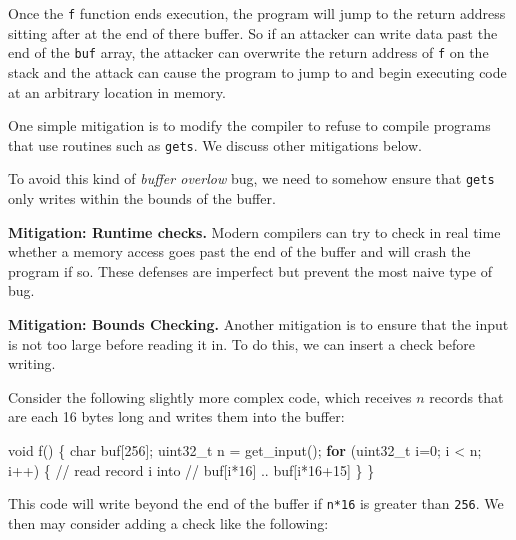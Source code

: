 \documentclass[
  letterpaper,
]{scrbook}
\newenvironment{Shaded}{\begin{snugshade}}{\end{snugshade}}
\newcommand{\CommentTok}[1]{\textcolor[rgb]{0.37,0.37,0.37}{#1}}
\newcommand{\ControlFlowTok}[1]{\textcolor[rgb]{0.00,0.23,0.31}{\textbf{#1}}}
\newcommand{\DataTypeTok}[1]{\textcolor[rgb]{0.68,0.00,0.00}{#1}}
\newcommand{\DecValTok}[1]{\textcolor[rgb]{0.68,0.00,0.00}{#1}}
\newcommand{\NormalTok}[1]{\textcolor[rgb]{0.00,0.23,0.31}{#1}}
\newcommand{\OperatorTok}[1]{\textcolor[rgb]{0.37,0.37,0.37}{#1}}
\theoremstyle{definition}
\theoremstyle{plain}
\theoremstyle{plain}
\theoremstyle{remark}
\begin{document}
Once the \texttt{f} function ends execution, the program will jump to
the return address sitting after at the end of there buffer. So if an
attacker can write data past the end of the \texttt{buf} array, the
attacker can overwrite the return address of \texttt{f} on the stack and
the attack can cause the program to jump to and begin executing code at
an arbitrary location in memory.

One simple mitigation is to modify the compiler to refuse to compile
programs that use routines such as \texttt{gets}. We discuss other
mitigations below.

To avoid this kind of \emph{buffer overlow} bug, we need to somehow
ensure that \texttt{gets} only writes within the bounds of the buffer.

\textbf{Mitigation: Runtime checks.} Modern compilers can try to check
in real time whether a memory access goes past the end of the buffer and
will crash the program if so. These defenses are imperfect but prevent
the most naive type of bug.

\textbf{Mitigation: Bounds Checking.} Another mitigation is to ensure
that the input is not too large before reading it in. To do this, we can
insert a check before writing.

Consider the following slightly more complex code, which receives \(n\)
records that are each 16 bytes long and writes them into the buffer:

\begin{Shaded}
\begin{Highlighting}[]
\DataTypeTok{void}\NormalTok{ f}\OperatorTok{()} \OperatorTok{\{}
    \DataTypeTok{char}\NormalTok{ buf}\OperatorTok{[}\DecValTok{256}\OperatorTok{];}
    \DataTypeTok{uint32\_t}\NormalTok{ n }\OperatorTok{=}\NormalTok{ get\_input}\OperatorTok{();}
    \ControlFlowTok{for} \OperatorTok{(}\DataTypeTok{uint32\_t}\NormalTok{ i}\OperatorTok{=}\DecValTok{0}\OperatorTok{;}\NormalTok{ i }\OperatorTok{\textless{}}\NormalTok{ n}\OperatorTok{;}\NormalTok{ i}\OperatorTok{++)} \OperatorTok{\{}
        \CommentTok{// read record i into}
        \CommentTok{// buf[i*16] .. buf[i*16+15]}
    \OperatorTok{\}}
\OperatorTok{\}}
\end{Highlighting}
\end{Shaded}

This code will write beyond the end of the buffer if \texttt{n*16} is
greater than \texttt{256}. We then may consider adding a check like the
following:
\end{document}
